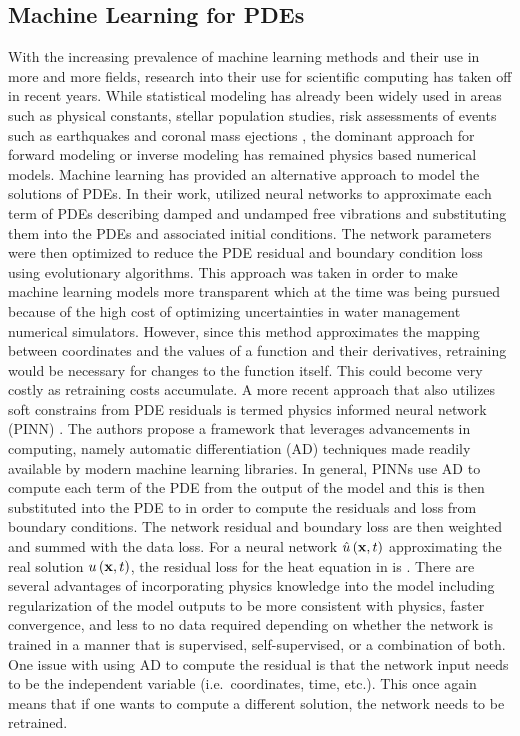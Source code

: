 \subsection*{Machine Learning for PDEs}
With the increasing prevalence of machine learning methods and their use in more and more fields, research into their use for scientific computing has taken off in recent years. While statistical modeling has already been widely used in areas such as physical constants, stellar population studies, risk assessments of events such as earthquakes and coronal mass ejections \autocite{berlinerPhysicalStatisticalModeling2003,anselmoComputationalMethodsReentry2005,reinhardtAsteroidRiskAssessment2016,uzanFundamentalConstantsTheir2003,spanosWhereStatisticalModels2006,bernardiStellarPopulationAnalysis2022}, the dominant approach for forward modeling or inverse modeling has remained physics based numerical models. Machine learning has provided an alternative approach to model the solutions of PDEs. In their work, \textcite{aartsNeuralNetworkMethod2001} utilized neural networks to approximate each term of PDEs describing damped and undamped free vibrations and substituting them into the PDEs and associated initial conditions. The network parameters were then optimized to reduce the PDE residual and boundary condition loss using evolutionary algorithms. This approach was taken in order to make machine learning models more transparent which at the time was being pursued because of the high cost of optimizing uncertainties in water management numerical simulators. However, since this method approximates the mapping between coordinates and the values of a function and their derivatives, retraining would be necessary for changes to the function itself. This could become very costly as retraining costs accumulate. A more recent approach that also utilizes soft constrains from PDE residuals is termed physics informed neural network (PINN) \autocite{raissiPhysicsinformedNeuralNetworks2019}. The authors propose a framework that leverages advancements in computing, namely automatic differentiation (AD) techniques made readily available by modern machine learning libraries. In general, PINNs use AD to compute each term of the PDE from the output of the model and this is then substituted into the PDE to in order to compute the residuals and loss from boundary conditions. The network residual and boundary loss are then weighted and summed with the data loss. For a neural network \(\hat{u}\left(\vb{x},t\right)\) approximating the real solution \(u\left(\vb{x},t\right)\), the residual loss for the heat equation in  is . There are several advantages of incorporating physics knowledge into the model including regularization of the model outputs to be more consistent with physics, faster convergence, and less to no data required depending on whether the network is trained in a manner that is supervised, self-supervised, or a combination of both. One issue with using AD to compute the residual is that the network input needs to be the independent variable (i.e.\ coordinates, time, etc.). This once again means that if one wants to compute a different solution, the network needs to be retrained.
